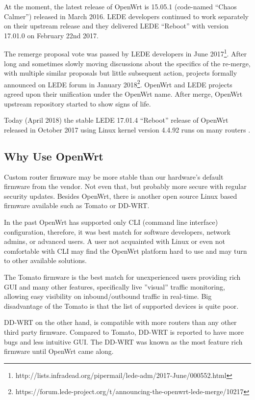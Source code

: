 At the moment, the latest release of OpenWrt is 15.05.1 (code-named “Chaos Calmer”) released in March 2016.
LEDE developers continued to work separately on their upstream release and they delivered LEDE “Reboot” with version 17.01.0 on February 22nd 2017.

The remerge proposal vote was passed by LEDE developers in June 2017\footnote{http://lists.infradead.org/pipermail/lede-adm/2017-June/000552.html}.
After long and sometimes slowly moving discussions about the specifics of the re-merge, with multiple similar proposals but little subsequent action, projects formally announced on LEDE forum in January 2018\footnote{https://forum.lede-project.org/t/announcing-the-openwrt-lede-merge/10217}.
OpenWrt and LEDE projects agreed upon their unification under the OpenWrt name.
After merge, OpenWrt upstream repository started to show signs of life.

Today (April 2018) the stable LEDE 17.01.4 “Reboot” release of OpenWrt released in October 2017 using Linux kernel version 4.4.92 runs on many routers \cite{lede_release}.



\subsection{Why Use OpenWrt}

Custom router firmware may be more stable than our hardware’s default firmware from the vendor.
Not even that, but probably more secure with regular security updates.
Besides OpenWrt, there is another open source Linux based firmware available such as Tomato or DD-WRT.

In the past OpenWrt has supported only CLI (command line interface) configuration, therefore, it was best match for software developers, network admins, or advanced users.
A user not acquainted with Linux or even not comfortable with CLI may find the OpenWrt platform hard to use and may turn to other available solutions.

The Tomato firmware is the best match for unexperienced users providing rich GUI and many other features, specifically live ”visual” traffic monitoring, allowing easy visibility on inbound/outbound traffic in real-time.
Big disadvantage of the Tomato is that the list of supported devices is quite poor.

DD-WRT on the other hand, is compatible with more routers than any other third party firmware.
Compared to Tomato, DD-WRT is reported to have more bugs and less intuitive GUI.
The DD-WRT was known as the most feature rich firmware until OpenWrt came along.

